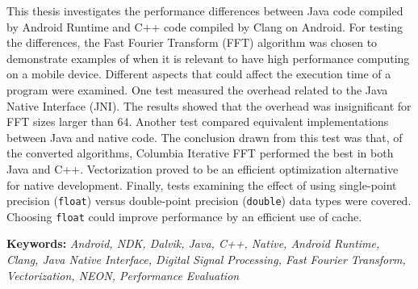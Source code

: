 This thesis investigates the performance differences between Java code compiled by Android Runtime and C++ code compiled by Clang on Android. For testing the differences, the Fast Fourier Transform (FFT) algorithm was chosen to demonstrate examples of when it is relevant to have high performance computing on a mobile device. Different aspects that could affect the execution time of a program were examined. One test measured the overhead related to the Java Native Interface (JNI). The results showed that the overhead was insignificant for FFT sizes larger than 64. Another test compared equivalent implementations between Java and native code. The conclusion drawn from this test was that, of the converted algorithms, Columbia Iterative FFT performed the best in both Java and C++. Vectorization proved to be an efficient optimization alternative for native development. Finally, tests examining the effect of using single-point precision (\texttt{float}) versus double-point precision (\texttt{double}) data types were covered. Choosing \texttt{float} could improve performance by an efficient use of cache.

\textbf{Keywords:} \emph{Android, NDK, Dalvik, Java, C++, Native, Android Runtime, Clang, Java Native Interface, Digital Signal Processing, Fast Fourier Transform, Vectorization, NEON, Performance Evaluation}
